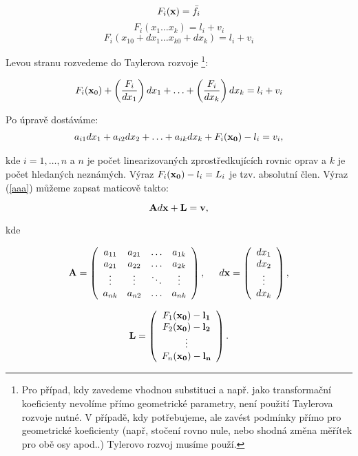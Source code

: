 $$F_i ({\bf x}) = \bar{f}_i$$
$$F_i (x_1 \ldots x_k) = l_i + v_i$$
$$F_i (x_{10} +dx_1 \ldots x_{k0} +dx_k) = l_i + v_i$$

Levou stranu rozvedeme do Taylerova rozvoje \footnote[1]{
Pro případ, kdy zavedeme vhodnou substituci a např. jako transformační
koeficienty nevolíme přímo geometrické parametry, není použití Taylerova 
rozvoje nutné. V případě, kdy potřebujeme, ale zavést podmínky přímo pro
geometrické koeficienty (např, stočení rovno nule,  nebo shodná změna měřítek
pro obě osy apod..) Tylerovo rozvoj musíme použí.}:

$$F_i ({\bf x}_0) +  \left(\frac{F_i}{dx_1}\right)dx_1 +\ldots+\left(\frac{F_i
}{dx_k}\right)dx_k = l_i + v_i$$

Po úpravě dostáváme:
\begin{eqnarray} \label{aaa}
 a_{i1} dx_1 + a_{i2} dx_2 + \ldots + a_{ik} dx_k + F_i ({\bf x_0})-l_i = v_i,
\end{eqnarray}

kde $i = 1, \ldots ,n$ a  $n$ je počet linearizovaných zprostředkujících rovnic
oprav a $k$ je počet hledaných neznámých. Výraz $ F_i ( {\bf x_0} )-l_i= L_i$ je
tzv. absolutní člen.
\newpage
Výraz (\ref{aaa}) můžeme zapsat maticově takto:

$${\bf A} d {\bf x} + {\bf L} = {\bf v}, $$

kde

\begin{eqnarray} {\bf A} = \left(
\begin{array}{cccc }
a_{11}  &   a_{21}  & \ldots  & a_{1k}  \\
a_{21}  &   a_{22}  & \ldots  &a_{2k} \\
\vdots  &   \vdots  & \ddots  & \vdots \\
a_{nk} &    a_{n2}  & \ldots  &a_{nk}                                
\end{array}
 \right), 
\hspace{0.5cm}
d \bf x =
\left(
\begin{array}{c }
 dx_1 \\
 dx_2\\
 \vdots\\
 dx_k                        
\end{array}
 \right), 
\end{eqnarray} 

\begin{eqnarray} 
 \label{L}
\bf L =
\left(
\begin{array}{c }
 F_1 (\bf x_0) - l_1 \\
 F_2 (\bf x_0) - l_2 \\
 \vdots\\
 F_n (\bf x_0) - l_n \\                   
\end{array}
 \right).
\end{eqnarray}


